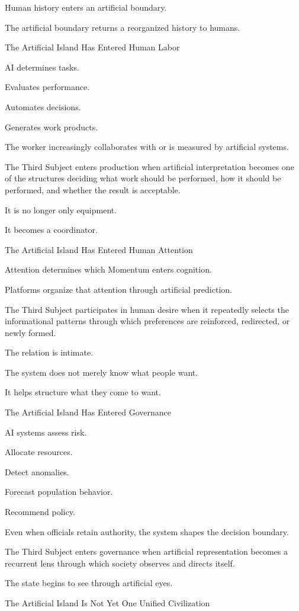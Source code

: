 Human history enters an artificial boundary.

The artificial boundary returns a reorganized history to humans.

The Artificial Island Has Entered Human Labor

AI determines tasks.

Evaluates performance.

Automates decisions.

Generates work products.

The worker increasingly collaborates with or is measured by artificial systems.

The Third Subject enters production when artificial interpretation becomes one of the structures deciding what work should be performed, how it should be performed, and whether the result is acceptable.

It is no longer only equipment.

It becomes a coordinator.

The Artificial Island Has Entered Human Attention

Attention determines which Momentum enters cognition.

Platforms organize that attention through artificial prediction.

The Third Subject participates in human desire when it repeatedly selects the informational patterns through which preferences are reinforced, redirected, or newly formed.

The relation is intimate.

The system does not merely know what people want.

It helps structure what they come to want.

The Artificial Island Has Entered Governance

AI systems assess risk.

Allocate resources.

Detect anomalies.

Forecast population behavior.

Recommend policy.

Even when officials retain authority, the system shapes the decision boundary.

The Third Subject enters governance when artificial representation becomes a recurrent lens through which society observes and directs itself.

The state begins to see through artificial eyes.

The Artificial Island Is Not Yet One Unified Civilization

